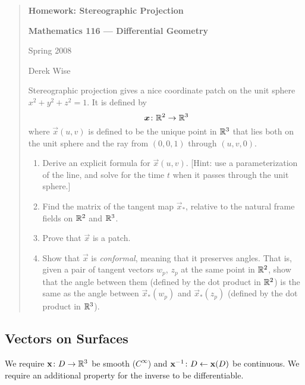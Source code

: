\begin{framed}
\begin{quotation}
  \begin{center}
    {\large\bfseries Homework: Stereographic Projection}\medbreak

    \textbf{Mathematics 116 --- Differential Geometry}

    Spring 2008

    Derek Wise
  \end{center}
  
Stereographic projection gives a nice coordinate patch on the unit
sphere $x^{2}+y^{2}+z^{2}=1$. It is defined by
\begin{equation*}
\boldsymbol{x}\colon\mathbb{R}^{2}\to\mathbb{R}^{3}
\end{equation*}
where $\vec{x}(u,v)$ is defined to be the unique point in $\mathbb{R}^{3}$ that
lies both on the unit sphere and the ray from $(0,0,1)$ through $(u,v,0)$.

\begin{enumerate}
\item Derive an explicit formula for $\vec{x}(u,v)$. [Hint: use a
  parameterization of the line, and solve for the time $t$ when it
  passes through the unit sphere.]
\item Find the matrix of the tangent map $\vec{x}_{*}$, relative to the
  natural frame fields on $\mathbb{R}^{2}$ and $\mathbb{R}^{3}$.
\item Prove that $\vec{x}$ is a patch.
\item Show that $\vec{x}$ is \emph{conformal}, meaning that it preserves
  angles. That is, given a pair of tangent vectors $w_{p}$, $z_{p}$ at
  the same point in $\mathbb{R}^{2}$, show that the angle between them (defined
  by the dot product in $\mathbb{R}^{2}$) is the same as the angle between
  $\vec{x}_{*}(w_{p})$ and $\vec{x}_{*}(z_{p})$ (defined by the dot
  product in $\mathbb{R}^{3}$).
\end{enumerate}
\end{quotation}
\end{framed}

\vfill\eject

\subsection{Vectors on Surfaces}

\M We require $\mathbf{x}\colon D\to\mathbb{R}^{3}$ be smooth ($C^{\infty}$) and
$\mathbf{x}^{-1}\colon D\gets\mathbf{x}(D)$ be continuous. We require an
additional property for the inverse to be differentiable.

